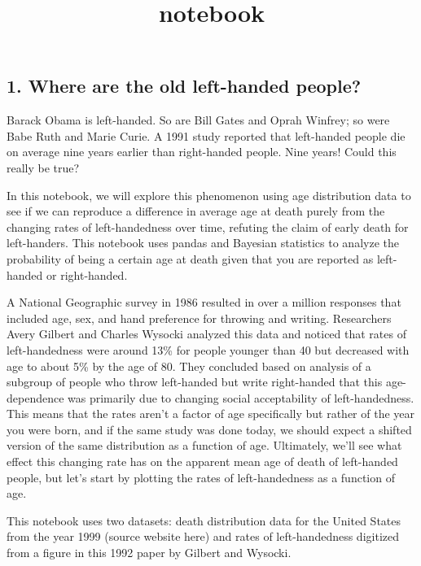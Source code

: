 \documentclass[11pt]{article}
\title{notebook}
\begin{document}
    
    
    \maketitle
    
    

    
    \subsection{1. Where are the old left-handed
people?}\label{where-are-the-old-left-handed-people}

Barack Obama is left-handed. So are Bill Gates and Oprah Winfrey; so
were Babe Ruth and Marie Curie. A 1991 study reported that left-handed
people die on average nine years earlier than right-handed people. Nine
years! Could this really be true?

In this notebook, we will explore this phenomenon using age distribution
data to see if we can reproduce a difference in average age at death
purely from the changing rates of left-handedness over time, refuting
the claim of early death for left-handers. This notebook uses pandas and
Bayesian statistics to analyze the probability of being a certain age at
death given that you are reported as left-handed or right-handed.

A National Geographic survey in 1986 resulted in over a million
responses that included age, sex, and hand preference for throwing and
writing. Researchers Avery Gilbert and Charles Wysocki analyzed this
data and noticed that rates of left-handedness were around 13\% for
people younger than 40 but decreased with age to about 5\% by the age of
80. They concluded based on analysis of a subgroup of people who throw
left-handed but write right-handed that this age-dependence was
primarily due to changing social acceptability of left-handedness. This
means that the rates aren't a factor of age specifically but rather of
the year you were born, and if the same study was done today, we should
expect a shifted version of the same distribution as a function of age.
Ultimately, we'll see what effect this changing rate has on the apparent
mean age of death of left-handed people, but let's start by plotting the
rates of left-handedness as a function of age.

This notebook uses two datasets: death distribution data for the United
States from the year 1999 (source website here) and rates of
left-handedness digitized from a figure in this 1992 paper by Gilbert
and Wysocki.
\end{document}
